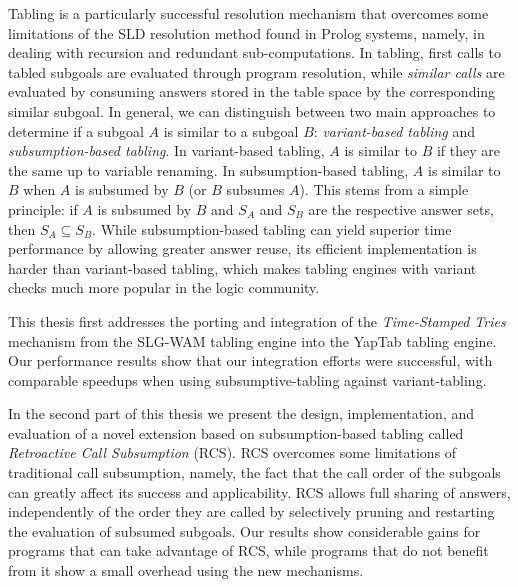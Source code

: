 Tabling is a particularly successful resolution mechanism that overcomes some limitations
of the SLD resolution method found in Prolog systems, namely, in dealing with recursion and redundant
sub-computations. In tabling, first calls to tabled subgoals are evaluated through
program resolution, while \emph{similar calls} are evaluated by consuming answers stored
in the table space by the corresponding similar subgoal.
In general, we can distinguish between two main approaches to determine if a subgoal $A$ is
similar to a subgoal $B$: \emph{variant-based tabling} and \emph{subsumption-based tabling}.
In variant-based tabling, $A$ is similar to $B$ if they are the same
up to variable renaming. In subsumption-based tabling, $A$ is similar to $B$ when $A$ is subsumed
by $B$ (or $B$ subsumes $A$). This stems from a simple principle: if $A$ is subsumed by $B$ and
$S_A$ and $S_B$ are the respective answer sets, then $S_A \subseteq S_B$.
While subsumption-based tabling can yield superior time performance by allowing greater answer
reuse, its efficient implementation is harder than variant-based tabling, which makes tabling engines
with variant checks much more popular in the logic community.

This thesis first addresses the porting and integration of the \emph{Time-Stamped Tries} mechanism
from the SLG-WAM tabling engine into the YapTab tabling engine. Our performance results show that our
integration efforts were successful, with comparable speedups when using subsumptive-tabling against
variant-tabling.

In the second part of this thesis we present the design, implementation, and evaluation of a novel extension
based on subsumption-based tabling called \emph{Retroactive Call Subsumption} (RCS). RCS overcomes some limitations
of traditional call subsumption, namely, the fact that the call order of the subgoals can greatly affect its
success and applicability. RCS allows full sharing of answers,
independently of the order they are called by selectively pruning and restarting the evaluation of subsumed
subgoals. Our results show considerable gains for programs that can take advantage of RCS, while programs
that do not benefit from it show a small overhead using the new mechanisms.